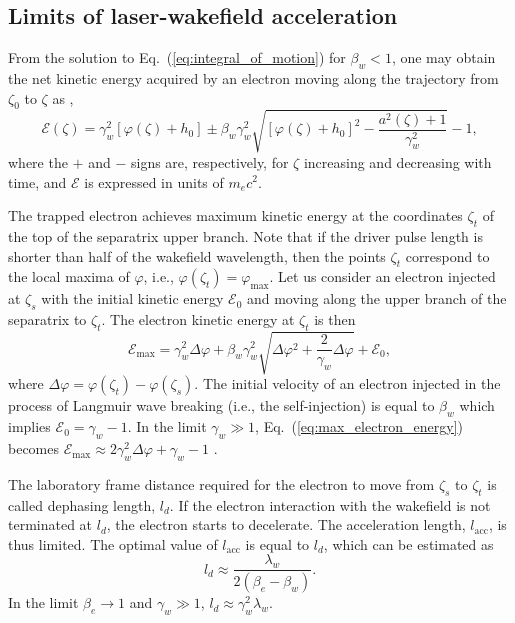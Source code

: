 \documentclass[10pt, a4paper, twoside, openright]{report}
\begin{document}
\subsection{Limits of laser-wakefield acceleration}

From the solution to Eq.~(\ref{eq:integral_of_motion}) for $ \beta_w < 1 $, one may obtain the net kinetic energy acquired by an electron moving along the trajectory from $ \zeta_0 $ to $ \zeta $ as \cite{Esirkepov2006, Bulanov2013, Bulanov2021},
\begin{equation}\label{eq:electron_energy}
	\mathcal{E} \left( \zeta \right) = \gamma_w^2 \left[ \varphi \left( \zeta \right) + h_0 \right] \pm \beta_w \gamma_w^2 \sqrt{ \left[ \varphi \left( \zeta \right) + h_0 \right]^2 - \frac{a^2 \left( \zeta \right) + 1}{\gamma_w^2}} - 1,
\end{equation}
where the $ + $ and $ - $ signs are, respectively, for $ \zeta $ increasing and decreasing with time, and $ \mathcal{E} $ is expressed in units of $ m_e c^2 $.

The trapped electron achieves maximum kinetic energy at the coordinates $ \zeta_t $ of the top of the separatrix upper branch. Note that if the driver pulse length is shorter than half of the wakefield wavelength, then the points $ \zeta_t $ correspond to the local maxima of $ \varphi $, i.e., $ \varphi \left( \zeta_t \right) = \varphi_{\mathrm{max}} $. Let us consider an electron injected at $ \zeta_s $ with the initial kinetic energy $ \mathcal{E}_0 $ and moving along the upper branch of the separatrix to $ \zeta_t $. The electron kinetic energy at $ \zeta_t $ is then \cite{Esirkepov2006, Bulanov2013, Bulanov2021}
\begin{equation}\label{eq:max_electron_energy}
	\mathcal{E}_{\mathrm{max}} = \gamma_w^2 \Delta \varphi + \beta_w \gamma_w^2 \sqrt{ \Delta \varphi^2 + \frac{2}{\gamma_w} \Delta \varphi } + \mathcal{E}_0,
\end{equation}
where $ \Delta \varphi = \varphi \left( \zeta_t \right) - \varphi \left( \zeta_s \right) $. The initial velocity of an electron injected in the process of Langmuir wave breaking (i.e., the self-injection) is equal to $ \beta_w $ which implies $ \mathcal{E}_0 = \gamma_w - 1 $. In the limit $ \gamma_w \gg 1 $, Eq.~(\ref{eq:max_electron_energy}) becomes $ \mathcal{E}_{\mathrm{max}} \approx 2 \gamma_w^2 \Delta \varphi + \gamma_w - 1 $ \cite{Esirkepov2006, Bulanov2013}.

The laboratory frame distance required for the electron to move from $ \zeta_s $ to $ \zeta_t $ is called dephasing length, $ l_d $. If the electron interaction with the wakefield is not terminated at $ l_d $, the electron starts to decelerate. The acceleration length, $ l_{\mathrm{acc}} $, is thus limited. The optimal value of $ l_{\mathrm{acc}} $ is equal to $ l_d $, which can be estimated as \cite{Esarey2009}
\begin{equation}\label{eq:dephasing_length}
	l_d \approx \frac{\lambda_w}{2 \left( \beta_e - \beta_w \right)}.
\end{equation}
In the limit $ \beta_e \rightarrow 1 $ and $ \gamma_w \gg 1 $, $ l_d \approx \gamma_w^2 \lambda_w $.
\end{document}
